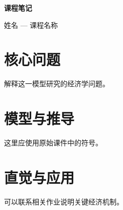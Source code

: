\documentclass[11pt]{ctexart}
\begin{document}
{\LARGE\bfseries 课程笔记\par}
\medskip

姓名 --- 课程名称

\section{核心问题}
解释这一模型研究的经济学问题。

\section{模型与推导}
这里应使用原始课件中的符号。

\section{直觉与应用}
可以联系相关作业说明关键经济机制。
\end{document}
